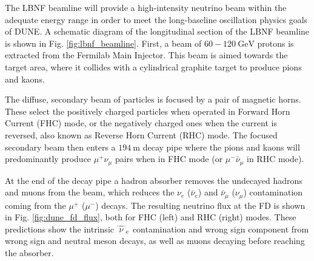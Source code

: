 The LBNF beamline will provide a high-intensity neutrino beam within the adequate energy range in order to meet the long-baseline oscillation physics goals of DUNE. A schematic diagram of the longitudinal section of the LBNF beamline is shown in Fig. \ref{fig:lbnf_beamline}. First, a beam of $60-120~\mathrm{GeV}$ protons is extracted from the Fermilab Main Injector. This beam is aimed towards the target area, where it collides with a cylindrical graphite target to produce pions and kaons.

The diffuse, secondary beam of particles is focused by a pair of magnetic horns. These select the positively charged particles when operated in Forward Horn Current (FHC) mode, or the negatively charged ones when the current is reversed, also known as Reverse Horn Current (RHC) mode. The focused secondary beam then enters a $194~\mathrm{m}$ decay pipe where the pions and kaons will predominantly produce $\mu^{+}\nu_{\mu}$ pairs when in FHC mode (or $\mu^{-}\bar{\nu}_{\mu}$ in RHC mode).

At the end of the decay pipe a hadron absorber removes the undecayed hadrons and muons from the beam, which reduces the $\nu_{e}$ ($\bar{\nu}_{e}$) and $\bar{\nu}_{\mu}$ ($\nu_{\mu}$) contamination  coming from the $\mu^{+}$ ($\mu^{-}$) decays. The resulting neutrino flux at the FD is shown in Fig. \ref{fig:dune_fd_flux}, both for FHC (left) and RHC (right) modes. These predictions show the intrinsic $\overset{\brabarb}{\nu}_{e}$ contamination and wrong sign component from wrong sign and neutral meson decays, as well as muons decaying before reaching the absorber.

